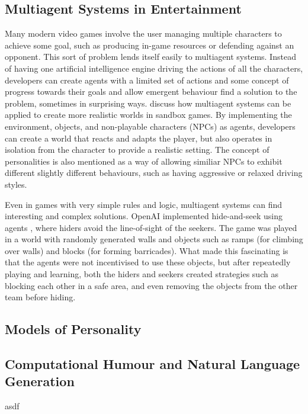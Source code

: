\documentclass[conference]{IEEEtran}
\begin{document}
\subsection{Multiagent Systems in Entertainment}

Many modern video games involve the user managing multiple characters to achieve some goal, such as producing in-game resources or defending against an opponent. This sort of problem lends itself easily to multiagent systems. Instead of having one artificial intelligence engine driving the actions of all the characters, developers can create agents with a limited set of actions and some concept of progress towards their goals and allow emergent behaviour find a solution to the problem, sometimes in surprising ways. 
\cite{sandboxmas} discuss how multiagent systems can be applied to create more realistic worlds in sandbox games. By implementing the environment, objects, and non-playable characters (NPCs) as agents, developers can create a world that reacts and adapts the player, but also operates in isolation from the character to provide a realistic setting. The concept of personalities is also mentioned as a way of allowing similiar NPCs to exhibit different slightly different behaviours, such as having aggressive or relaxed driving styles.

Even in games with very simple rules and logic, multiagent systems can find interesting and complex solutions. OpenAI implemented hide-and-seek using agents \cite{openaiemergent}, where hiders avoid the line-of-sight of the seekers. The game was played in a world with randomly generated walls and objects such as ramps (for climbing over walls) and blocks (for forming barricades). What made this fascinating is that the agents were not incentivised to use these objects, but after repeatedly playing and learning, both the hiders and seekers created strategies such as blocking each other in a safe area, and even removing the objects from the other team before hiding.

\subsection{Models of Personality}



\subsection{Computational Humour and Natural Language Generation}

\begin{thebibliography}{00}
		\bibitem asdf
\end{thebibliography}
\vspace{12pt}
\end{document}
